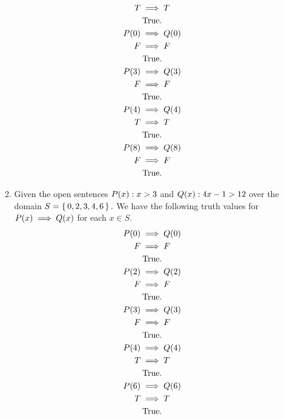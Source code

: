 \documentclass[12pt]{article}
\makeatletter
\newcommand*{\arabicodd}[1]{%
  \expandafter\@arabicodd\csname c@#1\endcsname
}
\newcommand*{\@arabicodd}[1]{%
  \@arabic{\numexpr(#1)*2-1\relax}%
}
\makeatother
\begin{document}
\begin{enumerate}[label=2.\arabicodd*, start=16]
\begin{enumerate}[label=(\alph*)]
\begin{gather*}
              T \implies T\\
              \qq{True.}\\
              P\qty(0) \implies Q\qty(0)\\
              F \implies F\\
              \qq{True.}\\
              P\qty(3) \implies Q\qty(3)\\
              F \implies F\\
              \qq{True.}\\
              P\qty(4) \implies Q\qty(4)\\
              T \implies T\\
              \qq{True.}\\
              P\qty(8) \implies Q\qty(8)\\
              F \implies F\\
              \qq{True.}\\
            \end{gather*}
      \item Given the open sentences $P\qty(x): x > 3$ and $Q\qty(x): 4x - 1 > 12$
            over the domain $S = \set{0,2,3,4,6}.$
            We have the following truth values for $P\qty(x) \implies Q\qty(x)$ for each
            $x \in S.$
            \begin{gather*}
              P\qty(0) \implies Q\qty(0)\\
              F \implies F\\
              \qq{True.}\\
              P\qty(2) \implies Q\qty(2)\\
              F \implies F\\
              \qq{True.}\\
              P\qty(3) \implies Q\qty(3)\\
              F \implies F\\
              \qq{True.}\\
              P\qty(4) \implies Q\qty(4)\\
              T \implies T\\
              \qq{True.}\\
              P\qty(6) \implies Q\qty(6)\\
              T \implies T\\
              \qq{True.}\\
            \end{gather*}
    \end{enumerate}

\end{enumerate}
\end{document}
